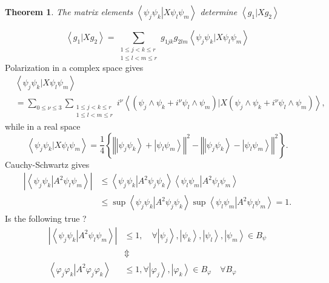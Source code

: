 \documentclass[aps,preprint]{revtex4}%
\newtheorem{theorem}{Theorem}
\begin{document}
\begin{theorem}
The matrix elements $\left\langle \psi_{j}\psi_{k}\left\vert X\psi_{l}\psi
_{m}\right.  \right\rangle $ determine $\left\langle g_{1}\left\vert X\right.
g_{2}\right\rangle $
\end{theorem}

%

\begin{equation}
\left\langle g_{1}\left\vert X\right.  g_{2}\right\rangle =\sum
_{\substack{1\leq j<k\leq r\\1\leq l<m\leq r}}g_{1jk}g_{2lm}\left\langle
\psi_{j}\psi_{k}\left\vert X\right.  \psi_{l}\psi_{m}\right\rangle
\end{equation}
Polarization in a complex space gives
\begin{align}
&  \left\langle \psi_{j}\psi_{k}\left\vert X\right.  \psi_{l}\psi
_{m}\right\rangle \nonumber\\
&  =\sum_{0\leq\nu\leq3}\sum_{\substack{1\leq j<k\leq r\\1\leq l<m\leq
r}}i^{\nu}\left\langle \left(  \psi_{j}\wedge\psi_{k}+i^{\nu}\psi_{l}%
\wedge\psi_{m}\right)  \left\vert X\right.  \left(  \psi_{j}\wedge\psi
_{k}+i^{\nu}\psi_{l}\wedge\psi_{m}\right)  \right\rangle ,
\end{align}
while in a real space
\begin{equation}
\left\langle \psi_{j}\psi_{k}\left\vert X\right.  \psi_{l}\psi_{m}%
\right\rangle =\frac{1}{4}\left\{  \left\Vert \left\vert \psi_{j}\psi
_{k}\right\rangle +\left\vert \psi_{l}\psi_{m}\right\rangle \right\Vert
^{2}-\left\Vert \left\vert \psi_{j}\psi_{k}\right\rangle -\left\vert \psi
_{l}\psi_{m}\right\rangle \right\Vert ^{2}\right\}  .
\end{equation}
Cauchy-Schwartz gives
\begin{align}
\left\vert \left\langle \psi_{j}\psi_{k}\left\vert A^{2}\right.  \psi_{l}%
\psi_{m}\right\rangle \right\vert  &  \leq\left\langle \psi_{j}\psi
_{k}\left\vert A^{2}\right.  \psi_{j}\psi_{k}\right\rangle \left\langle
\psi_{l}\psi_{m}\left\vert A^{2}\right.  \psi_{l}\psi_{m}\right\rangle
\nonumber\\
&  \leq\sup\left\langle \psi_{j}\psi_{k}\left\vert A^{2}\right.  \psi_{j}%
\psi_{k}\right\rangle \sup\left\langle \psi_{l}\psi_{m}\left\vert
A^{2}\right.  \psi_{l}\psi_{m}\right\rangle =1.
\end{align}
Is the following true ?
\begin{align}
\left\vert \left\langle \psi_{j}\psi_{k}\left\vert A^{2}\right.  \psi_{l}%
\psi_{m}\right\rangle \right\vert  &  \leq1,\quad\forall\left\vert \psi
_{j}\right\rangle ,\left\vert \psi_{k}\right\rangle ,\left\vert \psi
_{l}\right\rangle ,\left\vert \psi_{m}\right\rangle \in B_{\psi}\nonumber\\
&  \Updownarrow\nonumber\\
\left\langle \varphi_{j}\varphi_{k}\left\vert A^{2}\right.  \varphi_{j}%
\varphi_{k}\right\rangle  &  \leq1,\forall\left\vert \varphi_{j}\right\rangle
,\left\vert \varphi_{k}\right\rangle \in B_{\varphi}\quad\forall B_{\varphi}%
\end{align}
%
\end{document}
